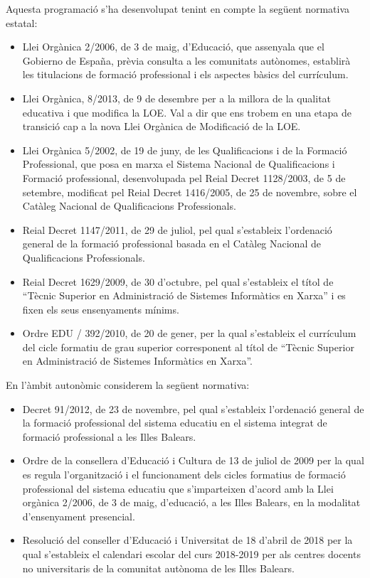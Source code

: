\documentclass[catalan, a4paper, 12pt, titlepage]{article}
\begin{document}
Aquesta programació s'ha desenvolupat tenint en compte la següent normativa estatal:
\begin{itemize}
	\item Llei Orgànica 2/2006, de 3 de maig, d'Educació, que assenyala que el Gobierno de España, prèvia consulta a les comunitats autònomes, establirà les titulacions de formació professional i els aspectes bàsics del currículum.
	\item Llei Orgànica, 8/2013, de 9 de desembre per a la millora de la qualitat educativa i que modifica la LOE. Val a dir que ens trobem en una etapa de transició cap a la nova Llei Orgànica de Modificació de la LOE.
	\item Llei Orgànica 5/2002, de 19 de juny, de les Qualificacions i de la Formació Professional, que posa en marxa el Sistema Nacional de Qualificacions i Formació professional, desenvolupada pel Reial Decret 1128/2003, de 5 de setembre, modificat pel Reial Decret 1416/2005, de 25 de novembre, sobre el Catàleg Nacional de Qualificacions Professionals.
	\item Reial Decret 1147/2011, de 29 de juliol, pel qual s'estableix l'ordenació general de la formació professional basada en el Catàleg Nacional de Qualificacions Professionals.
	\item Reial Decret 1629/2009, de 30 d'octubre, pel qual s'estableix el títol de ``Tècnic Superior en Administració de Sistemes Informàtics en Xarxa'' i es fixen els seus ensenyaments mínims.
	\item Ordre EDU / 392/2010, de 20 de gener, per la qual s'estableix el currículum del cicle formatiu de grau superior corresponent al títol de ``Tècnic Superior en Administració de Sistemes Informàtics en Xarxa''.
\end{itemize}

En l'àmbit autonòmic considerem la següent normativa:
\begin{itemize}
	\item Decret 91/2012, de 23 de novembre, pel qual s'estableix l'ordenació general de la formació professional del sistema educatiu en el sistema integrat de formació professional a les Illes Balears.
	\item Ordre de la consellera d'Educació i Cultura de 13 de juliol de 2009 per la qual es regula l'organització i el funcionament dels cicles formatius de formació professional del sistema educatiu que s'imparteixen d'acord amb la Llei orgànica 2/2006, de 3 de maig, d'educació, a les Illes Balears, en la modalitat d'ensenyament presencial.
	\item Resolució del conseller d'Educació i Universitat de 18 d'abril de 2018 per la qual s'estableix el calendari escolar del curs 2018-2019 per als centres docents no universitaris de la comunitat autònoma de les Illes Balears.
\end{itemize}
\end{document}
